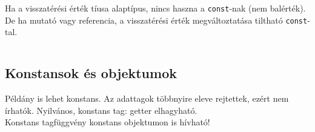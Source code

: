 \documentclass[usenames,dvipsnames,aspectratio=169]{beamer}
\begin{document}
\begin{frame}
    Ha a visszatérési érték tíusa alaptípus, nincs haszna a \texttt{const}-nak (nem balérték). \\
    De ha mutató vagy referencia, a visszatérési érték megváltoztatása tiltható \texttt{const}-tal.
    \begin{columns}[T]
        \begin{column}{0.45\textwidth}
            \begin{exampleblock}{}
                \small
                
            \end{exampleblock}
        \end{column}
        \begin{column}{0.45\textwidth}
            \begin{exampleblock}{}
                \small
                
            \end{exampleblock}
        \end{column}
    \end{columns}
\end{frame}

\begin{frame}
    \begin{exampleblock}{}
        \small
        
        
    \end{exampleblock}
\end{frame}

\subsection{Konstansok és objektumok}

\begin{frame}
    Példány is lehet konstans. Az adattagok többnyire eleve rejtettek, ezért nem írhatók. Nyilvános, konstans tag: getter elhagyható.\\
    Konstans tagfüggvény konstans objektumon is hívható!
    \begin{exampleblock}{}
        \small
        
    \end{exampleblock}
\end{frame}
\end{document}
